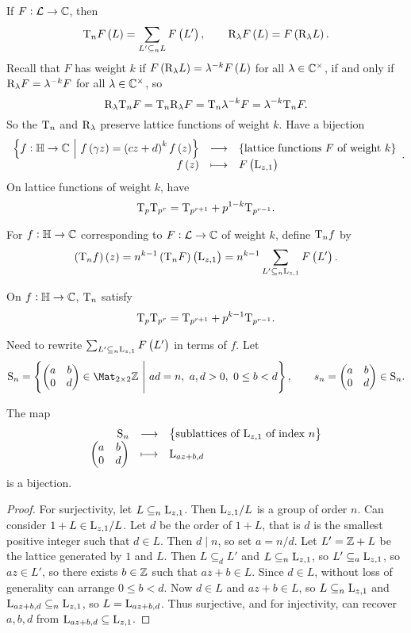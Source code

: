 
If $ F : \mathcal{L} \to \mathbb{C} $, then
$$ \T_nF\br{L} = \sum_{L' \subseteq_n L} F\br{L'}, \qquad \R_\lambda F\br{L} = F\br{\R_\lambda L}. $$
Recall that $ F $ has weight $ k $ if $ F\br{\R_\lambda L} = \lambda^{-k}F\br{L} $ for all $ \lambda \in \mathbb{C}^\times $, if and only if $ \mathrm{R}_\lambda F = \lambda^{-k}F $ for all $ \lambda \in \mathbb{C}^\times $, so
$$ \mathrm{R}_\lambda\mathrm{T}_nF = \mathrm{T}_n\mathrm{R}_\lambda F = \mathrm{T}_n\lambda^{-k}F = \lambda^{-k}\mathrm{T}_nF. $$
So the $ \mathrm{T}_n $ and $ \mathrm{R}_\lambda $ preserve lattice functions of weight $ k $. Have a bijection
$$ \function{\cbr{f : \HH \to \CC \st f\br{\gamma z} = \br{cz + d}^kf\br{z}}}{\cbr{\text{lattice functions} \ F \ \text{of weight} \ k}}{f\br{z}}{F\br{\L_{z, 1}}}. $$
On lattice functions of weight $ k $, have
$$ \mathrm{T}_p\mathrm{T}_{p^r} = \mathrm{T}_{p^{r + 1}} + p^{1 - k}\mathrm{T}_{p^{r - 1}}. $$

\begin{definition}
For $ f : \mathbb{H} \to \mathbb{C} $ corresponding to $ F : \mathcal{L} \to \mathbb{C} $ of weight $ k $, define $ \mathrm{T}_nf $ by
$$ \br{\T_nf}\br{z} = n^{k - 1}\br{\T_nF}\br{\L_{z, 1}} = n^{k - 1}\sum_{L' \subseteq_n \L_{z, 1}} F\br{L'}. $$
\end{definition}

On $ f : \mathbb{H} \to \mathbb{C} $, $ \mathrm{T}_n $ satisfy
$$ \mathrm{T}_p\mathrm{T}_{p^r} = \mathrm{T}_{p^{r + 1}} + p^{k - 1}\mathrm{T}_{p^{r - 1}}. $$

\pagebreak

Need to rewrite $ \sum_{L' \subseteq_n \L_{z, 1}} F\br{L'} $ in terms of $ f $. Let
$$ \S_n = \cbr{\twobytwo{a}{b}{0}{d} \in \Mat_{2 \times 2} \ZZ \st ad = n, \ a, d > 0, \ 0 \le b < d}, \qquad s_n = \twobytwo{a}{b}{0}{d} \in \S_n. $$

\begin{lemma}
The map
$$ \function{\S_n}{\cbr{\text{sublattices of} \ \L_{z, 1} \ \text{of index} \ n}}{\twobytwo{a}{b}{0}{d}}{\L_{az + b, d}} $$
is a bijection.
\end{lemma}

\begin{proof}
For surjectivity, let $ L \subseteq_n \mathrm{L}_{z, 1} $. Then $ \mathrm{L}_{z, 1} / L $ is a group of order $ n $. Can consider $ 1 + L \in \mathrm{L}_{z, 1} / L $. Let $ d $ be the order of $ 1 + L $, that is $ d $ is the smallest positive integer such that $ d \in L $. Then $ d \mid n $, so set $ a = n / d $. Let $ L' = \mathbb{Z} + L $ be the lattice generated by $ 1 $ and $ L $. Then $ L \subseteq_d L' $ and $ L \subseteq_n \mathrm{L}_{z, 1} $, so $ L' \subseteq_a \mathrm{L}_{z, 1} $, so $ az \in L' $, so there exists $ b \in \mathbb{Z} $ such that $ az + b \in L $. Since $ d \in L $, without loss of generality can arrange $ 0 \le b < d $. Now $ d \in L $ and $ az + b \in L $, so $ L \subseteq_n \mathrm{L}_{z, 1} $ and $ \mathrm{L}_{az + b, d} \subseteq_n \mathrm{L}_{z, 1} $, so $ L = \mathrm{L}_{az + b, d} $. Thus surjective, and for injectivity, can recover $ a, b, d $ from $ \mathrm{L}_{az + b, d} \subseteq \mathrm{L}_{z, 1} $.
\end{proof}


